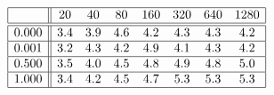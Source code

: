 \[
\begin{array}{|c||ccccccc|}
\hline 
& 20 & 40 & 80 & 160 & 320 & 640 & 1280\\
\hline \hline 
0.000 & 3.4 & 3.9 & 4.6 & 4.2 & 4.3 & 4.3 & 4.2 \\ \hline 
0.001 & 3.2 & 4.3 & 4.2 & 4.9 & 4.1 & 4.3 & 4.2 \\ \hline 
0.500 & 3.5 & 4.0 & 4.5 & 4.8 & 4.9 & 4.8 & 5.0 \\ \hline 
1.000 & 3.4 & 4.2 & 4.5 & 4.7 & 5.3 & 5.3 & 5.3 \\ \hline 
\end{array}
\]

